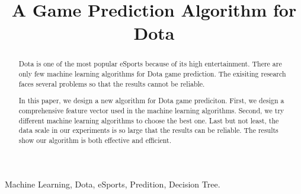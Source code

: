 \documentclass{article}
\title{A Game Prediction Algorithm for Dota}
\begin{document}
%
\maketitle
%
\begin{abstract}
Dota is one of the most popular eSports because of its high entertainment.
There are only few machine learning algorithms for Dota game prediction.
The exisiting research faces several problems so that the results cannot
be reliable.

In this paper, we design a new algorithm for Dota game prediciton.  
First, we design a comprehensive feature vector used in the machine learning algorithms.
Second, we try different machine learning algorithms to choose the best one.
Last but not least, the data scale in our experiments is so large that the results can be reliable.
The results show our algorithm is both effective and efficient.

\end{abstract}
\begin{keywords}
Machine Learning, Dota, eSports, Predition, Decision Tree.
\end{keywords}
%









\vfill\pagebreak



\end{document}
